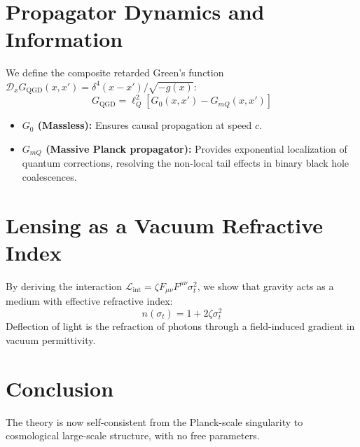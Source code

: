 \documentclass[11pt,a4paper]{article}
\begin{document}
\section{Propagator Dynamics and Information}
We define the composite retarded Green's function $\mathcal{D}_x G_{\text{QGD}}(x,x') = \delta^4(x-x')/\sqrt{-g(x)}$:
\begin{equation}
G_{\text{QGD}} = \ell_Q^2 \left[ G_0(x,x') - G_{mQ}(x,x') \right]
\end{equation}
\begin{itemize}
    \item \textbf{$G_0$ (Massless):} Ensures causal propagation at speed $c$.
    \item \textbf{$G_{mQ}$ (Massive Planck propagator):} Provides exponential localization of quantum corrections, resolving the non-local tail effects in binary black hole coalescences.
\end{itemize}

\section{Lensing as a Vacuum Refractive Index}
By deriving the interaction $\mathcal{L}_{\text{int}} = \zeta F_{\mu\nu} F^{\mu\nu} \sigma_t^2$, we show that gravity acts as a medium with effective refractive index:
\begin{equation}
n(\sigma_t) = 1 + 2\zeta \sigma_t^2
\end{equation}
Deflection of light is the refraction of photons through a field-induced gradient in vacuum permittivity.

\section{Conclusion}
The theory is now self-consistent from the Planck-scale singularity to cosmological large-scale structure, with no free parameters. 
\end{document}
